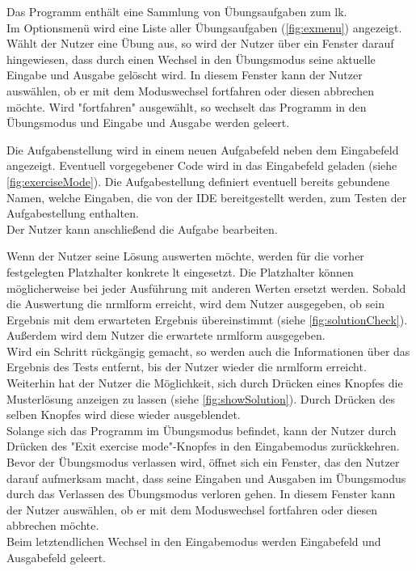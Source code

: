 \documentclass[parskip=full,11pt,twoside]{scrartcl}
\begin{document}
Das Programm enthält eine Sammlung von Übungsaufgaben zum \gls{lk}.\\
Im Optionsmenü wird eine Liste aller Übungsaufgaben (\cref{fig:exmenu}) angezeigt.\\
Wählt der Nutzer eine Übung aus, so wird der Nutzer über ein Fenster darauf hingewiesen, dass durch einen Wechsel in den Übungsmodus seine aktuelle Eingabe und Ausgabe gelöscht wird. In diesem Fenster kann der Nutzer auswählen, ob er mit dem Moduswechsel fortfahren oder diesen abbrechen möchte. Wird "fortfahren" ausgewählt, so wechselt das Programm in den Übungsmodus und Eingabe und Ausgabe werden geleert.

Die Aufgabenstellung wird in einem neuen Aufgabefeld neben dem Eingabefeld angezeigt. 
Eventuell vorgegebener Code wird in das Eingabefeld geladen (siehe \cref{fig:exerciseMode}).
Die Aufgabestellung definiert eventuell bereits gebundene Namen, welche Eingaben, die von der IDE bereitgestellt werden, zum Testen der Aufgabestellung enthalten.\\
Der Nutzer kann anschließend die Aufgabe bearbeiten.
 
Wenn der Nutzer seine Lösung auswerten möchte, werden für die vorher festgelegten Platzhalter konkrete \gls{lt} eingesetzt. Die Platzhalter können möglicherweise bei jeder Ausführung mit anderen Werten ersetzt werden.
Sobald die Auswertung die \gls{nrmlform} erreicht, wird dem Nutzer ausgegeben, ob sein Ergebnis mit dem erwarteten Ergebnis übereinstimmt (siehe \cref{fig:solutionCheck}). Außerdem wird dem Nutzer die erwartete \gls{nrmlform} ausgegeben.\\
Wird ein Schritt rückgängig gemacht, so werden auch die Informationen über das Ergebnis des Tests entfernt, bis der Nutzer wieder die \gls{nrmlform} erreicht. \\
Weiterhin hat der Nutzer die Möglichkeit, sich durch Drücken eines Knopfes die Musterlösung anzeigen zu lassen (siehe \cref{fig:showSolution}). Durch Drücken des selben Knopfes wird diese wieder ausgeblendet. \\

Solange sich das Programm im Übungsmodus befindet, kann der Nutzer durch Drücken des "Exit exercise mode"-Knopfes in den Eingabemodus zurückkehren.\\
Bevor der Übungsmodus verlassen wird, öffnet sich ein Fenster, das den Nutzer darauf aufmerksam macht, dass seine Eingaben und Ausgaben im Übungsmodus durch das Verlassen des Übungsmodus verloren gehen. In diesem Fenster kann der Nutzer auswählen, ob er mit dem Moduswechsel fortfahren oder diesen abbrechen möchte. \\
Beim letztendlichen Wechsel in den Eingabemodus werden Eingabefeld und Ausgabefeld geleert.
\end{document}
